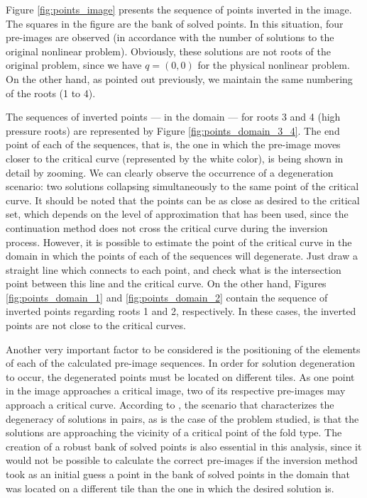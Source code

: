 \documentclass[journal=iecred,manuscript=article]{achemso}
\theoremstyle{definition}
\theoremstyle{remark}
\begin{document}
Figure \ref{fig:points_image} presents the sequence of points inverted in the image. The squares in the figure are the bank of solved points. In this situation, four pre-images are observed (in accordance with the number of solutions to the original nonlinear problem). Obviously, these solutions are not roots of the original problem, since we have $ q = \left(0,0\right) $ for the physical nonlinear problem. On the other hand, as pointed out previously, we maintain the same numbering of the roots (1 to 4).

The sequences of inverted points --- in the domain --- for roots 3 and 4 (high pressure roots) are represented by Figure \ref{fig:points_domain_3_4}. The end point of each of the sequences, that is, the one in which the pre-image moves closer to the critical curve (represented by the white color), is being shown in detail by zooming. We can clearly observe the occurrence of a degeneration scenario: two solutions collapsing simultaneously to the same point of the critical curve. It should be noted that the points can be as close as desired to the critical set, which depends on the level of approximation that has been used, since the continuation method does not cross the critical curve during the inversion process. However, it is possible to estimate the point of the critical curve in the domain in which the points of each of the sequences will degenerate. Just draw a straight line which connects to each point, and check what is the intersection point between this line and the critical curve. On the other hand, Figures \ref{fig:points_domain_1} and \ref{fig:points_domain_2} contain the sequence of inverted points regarding roots 1 and 2, respectively. In these cases, the inverted points are not close to the critical curves.

Another very important factor to be considered is the positioning of the elements of each of the calculated pre-image sequences. In order for solution degeneration to occur, the degenerated points must be located on different tiles. As one point in the image approaches a critical image, two of its respective pre-images may approach a critical curve. According to \citet{malta}, the scenario that characterizes the degeneracy of solutions in pairs, as is the case of the problem studied, is that the solutions are approaching the vicinity of a critical point of the fold type. The creation of a robust bank of solved points is also essential in this analysis, since it would not be possible to calculate the correct pre-images if the inversion method took as an initial guess a point in the bank of solved points in the domain that was located on a different tile than the one in which the desired solution is.
\end{document}
